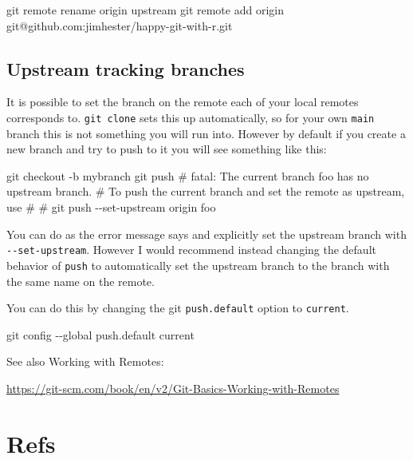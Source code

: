 \documentclass[
]{book}
\newenvironment{Shaded}{\begin{snugshade}}{\end{snugshade}}
\newcommand{\NormalTok}[1]{#1}
\begin{document}
\begin{Shaded}
\begin{Highlighting}[]
\NormalTok{git remote rename origin upstream}
\NormalTok{git remote add origin git@github.com:jimhester/happy{-}git{-}with{-}r.git}
\end{Highlighting}
\end{Shaded}

\section{Upstream tracking branches}\label{upstream-tracking-branches}

It is possible to set the branch on the remote each of your local remotes
corresponds to.
\texttt{git\ clone} sets this up automatically, so for your own \texttt{main} branch this is not something you will run into.
However by default if you create a new branch and try to push to it you will see something like this:

\begin{Shaded}
\begin{Highlighting}[]
\NormalTok{git checkout {-}b mybranch}
\NormalTok{git push}
\NormalTok{\# fatal: The current branch foo has no upstream branch.}
\NormalTok{\# To push the current branch and set the remote as upstream, use}
\NormalTok{\#}
\NormalTok{\#     git push {-}{-}set{-}upstream origin foo}
\end{Highlighting}
\end{Shaded}

You can do as the error message says and explicitly set the upstream branch
with \texttt{-\/-set-upstream}.
However I would recommend instead changing the default behavior of \texttt{push} to automatically set the upstream branch to the branch with the same name on the remote.

You can do this by changing the git \texttt{push.default} option to \texttt{current}.

\begin{Shaded}
\begin{Highlighting}[]
\NormalTok{git config {-}{-}global push.default current}
\end{Highlighting}
\end{Shaded}

See also Working with Remotes:

\url{https://git-scm.com/book/en/v2/Git-Basics-Working-with-Remotes}

\chapter{Refs}\label{git-refs}
\end{document}
